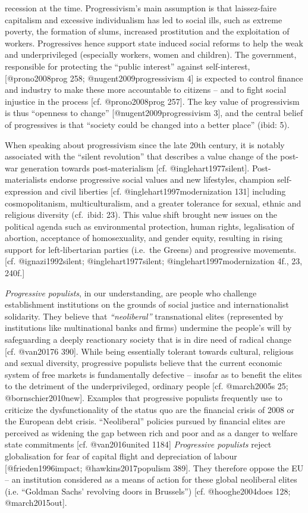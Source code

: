 \documentclass[]{article}
\begin{document}
recession at the time. Progressivism's main assumption is that
laissez-faire capitalism and excessive individualism has led to social
ills, such as extreme poverty, the formation of slums, increased
prostitution and the exploitation of workers. Progressives hence support
state induced social reforms to help the weak and underprivileged
(especially workers, women and children). The government, responsible
for protecting the ``public interest'' against self-interest,
{[}@prono2008prog 258; @nugent2009progressivism 4{]} is expected to
control finance and industry to make these more accountable to citizens
-- and to fight social injustice in the process {[}cf. @prono2008prog
257{]}. The key value of progressivism is thus ``openness to change''
{[}@nugent2009progressivism 3{]}, and the central belief of progressives
is that ``society could be changed into a better place'' (ibid: 5).

When speaking about progressivism since the late 20th century, it is
notably associated with the ``silent revolution'' that describes a value
change of the post-war generation towards post-materialism {[}cf.
@inglehart1977silent{]}. Post-materialists endorse progressive social
values and new lifestyles, champion self-expression and civil liberties
{[}cf. @inglehart1997modernization 131{]} including cosmopolitanism,
multiculturalism, and a greater tolerance for sexual, ethnic and
religious diversity (cf.~ibid: 23). This value shift brought new issues
on the political agenda such as environmental protection, human rights,
legalisation of abortion, acceptance of homosexuality, and gender
equity, resulting in rising support for left-libertarian parties
(i.e.~the Greens) and progressive movements. {[}cf. @ignazi1992silent;
@inglehart1977silent; @inglehart1997modernization 4f., 23, 240f.{]}

\emph{Progressive populists}, in our understanding, are people who
challenge establishment institutions on the grounds of social justice
and internationalist solidarity. They believe that \emph{``neoliberal''}
transnational elites (represented by institutions like multinational
banks and firms) undermine the people's will by safeguarding a deeply
reactionary society that is in dire need of radical change {[}cf.
@van20176 390{]}. While being essentially tolerant towards cultural,
religious and sexual diversity, progressive populists believe that the
current economic system of free markets is fundamentally defective --
insofar as to benefit the elites to the detriment of the
underprivileged, ordinary people {[}cf. @march2005s 25;
@bornschier2010new{]}. Examples that progressive populists frequently
use to criticize the dysfunctionality of the status quo are the
financial crisis of 2008 or the European debt crisis. ``Neoliberal''
policies pursued by financial elites are perceived as widening the gap
between rich and poor and as a danger to welfare state commitments
{[}cf. @van2016united 1184{]} \emph{Progressive populists} reject
globalisation for fear of capital flight and depreciation of labour
{[}@frieden1996impact; @hawkins2017populism 389{]}. They therefore
oppose the EU -- an institution considered as a means of action for
these global neoliberal elites (i.e. ``Goldman Sachs' revolving doors in
Brussels'') {[}cf. @hooghe2004does 128; @march2015out{]}.
\end{document}
